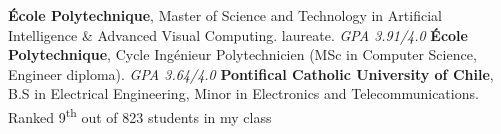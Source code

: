%
%
%


\begin{scholarship}
    				{\textbf{École Polytechnique}, Master of Science and Technology in Artificial Intelligence \& Advanced Visual Computing. \textit{} laureate. \textit{GPA 3.91/4.0}
                    }
    \vspace{-1em}
    				{\textbf{École Polytechnique}, Cycle Ingénieur Polytechnicien (MSc in Computer Science, Engineer diploma). \textit{GPA 3.64/4.0}
                    }
    \vspace{-1em}
					{\textbf{Pontifical Catholic University of Chile}, B.S in Electrical Engineering, Minor in Electronics and Telecommunications. Ranked 9\textsuperscript{th} out of 823 students in my class
                    }
\end{scholarship}